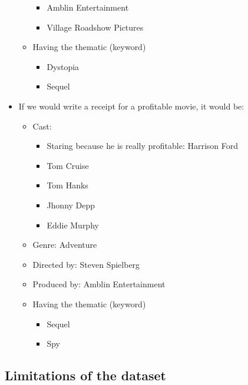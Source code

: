 \documentclass[11pt]{article}
\providecommand{\tightlist}{%
      \setlength{\itemsep}{0pt}\setlength{\parskip}{0pt}}
\begin{document}
\begin{itemize}
\begin{itemize}
    \begin{itemize}
    \tightlist
    \item
      Amblin Entertainment
    \item
      Village Roadshow Pictures
    \end{itemize}
  \item
    Having the thematic (keyword)

    \begin{itemize}
    \tightlist
    \item
      Dystopia
    \item
      Sequel
    \end{itemize}
  \end{itemize}
\item
  If we would write a receipt for a profitable movie, it would be:

  \begin{itemize}
  \tightlist
  \item
    Cast:

    \begin{itemize}
    \tightlist
    \item
      Staring because he is really profitable: Harrison Ford
    \item
      Tom Cruise
    \item
      Tom Hanks
    \item
      Jhonny Depp
    \item
      Eddie Murphy
    \end{itemize}
  \item
    Genre: Adventure
  \item
    Directed by: Steven Spielberg
  \item
    Produced by: Amblin Entertainment
  \item
    Having the thematic (keyword)

    \begin{itemize}
    \tightlist
    \item
      Sequel
    \item
      Spy
    \end{itemize}
  \end{itemize}
\end{itemize}

\subsection{Limitations of the
dataset}\label{limitations-of-the-dataset}
\end{document}

